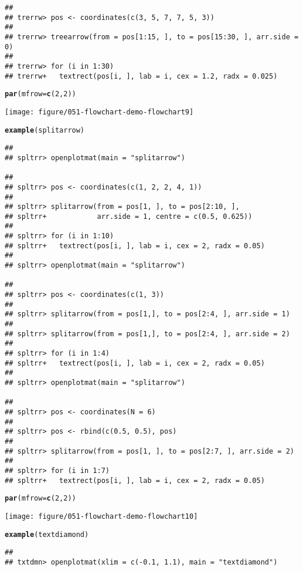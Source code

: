 \documentclass{article}\usepackage{graphicx, color}
\makeatletter
\def\maxwidth{ %
  \ifdim\Gin@nat@width>\linewidth
    \linewidth
  \else
    \Gin@nat@width
  \fi
}
\newcommand{\hlfunctioncall}[1]{\textcolor[rgb]{0.501960784313725,0,0.329411764705882}{\textbf{#1}}}%
\newenvironment{kframe}{%
 \def\at@end@of@kframe{}%
 \ifinner\ifhmode%
  \def\at@end@of@kframe{\end{minipage}}%
  \begin{minipage}{\columnwidth}%
 \fi\fi%
 \def\FrameCommand##1{\hskip\@totalleftmargin \hskip-\fboxsep
 \colorbox{shadecolor}{##1}\hskip-\fboxsep
     \hskip-\linewidth \hskip-\@totalleftmargin \hskip\columnwidth}%
 \MakeFramed {\advance\hsize-\width
   \@totalleftmargin\z@ \linewidth\hsize
   \@setminipage}}%
 {\par\unskip\endMakeFramed%
 \at@end@of@kframe}
\newenvironment{knitrout}{}{} %
\makeatother
\begin{document}
\begin{knitrout}
\begin{kframe}
\begin{verbatim}
## 
## trerrw> pos <- coordinates(c(3, 5, 7, 7, 5, 3))
## 
## trerrw> treearrow(from = pos[1:15, ], to = pos[15:30, ], arr.side = 0)
## 
## trerrw> for (i in 1:30) 
## trerrw+   textrect(pos[i, ], lab = i, cex = 1.2, radx = 0.025)
\end{verbatim}
\begin{alltt}
\hlfunctioncall{par}(mfrow = \hlfunctioncall{c}(2, 2))
\end{alltt}
\end{kframe}
\texttt{[image: figure/051-flowchart-demo-flowchart9]} 
\begin{kframe}\begin{alltt}
\hlfunctioncall{example}(splitarrow)
\end{alltt}
\begin{verbatim}
## 
## spltrr> openplotmat(main = "splitarrow")

## 
## spltrr> pos <- coordinates(c(1, 2, 2, 4, 1))
## 
## spltrr> splitarrow(from = pos[1, ], to = pos[2:10, ], 
## spltrr+            arr.side = 1, centre = c(0.5, 0.625))
## 
## spltrr> for (i in 1:10) 
## spltrr+   textrect(pos[i, ], lab = i, cex = 2, radx = 0.05)
## 
## spltrr> openplotmat(main = "splitarrow")

## 
## spltrr> pos <- coordinates(c(1, 3))
## 
## spltrr> splitarrow(from = pos[1,], to = pos[2:4, ], arr.side = 1)
## 
## spltrr> splitarrow(from = pos[1,], to = pos[2:4, ], arr.side = 2)
## 
## spltrr> for (i in 1:4) 
## spltrr+   textrect(pos[i, ], lab = i, cex = 2, radx = 0.05)
## 
## spltrr> openplotmat(main = "splitarrow")

## 
## spltrr> pos <- coordinates(N = 6)
## 
## spltrr> pos <- rbind(c(0.5, 0.5), pos)
## 
## spltrr> splitarrow(from = pos[1, ], to = pos[2:7, ], arr.side = 2)
## 
## spltrr> for (i in 1:7)
## spltrr+   textrect(pos[i, ], lab = i, cex = 2, radx = 0.05)
\end{verbatim}
\begin{alltt}
\hlfunctioncall{par}(mfrow = \hlfunctioncall{c}(2, 2))
\end{alltt}
\end{kframe}
\texttt{[image: figure/051-flowchart-demo-flowchart10]} 
\begin{kframe}\begin{alltt}
\hlfunctioncall{example}(textdiamond)
\end{alltt}
\begin{verbatim}
## 
## txtdmn> openplotmat(xlim = c(-0.1, 1.1), main = "textdiamond")


\end{verbatim}
\end{kframe}
\end{knitrout}
\end{document}
